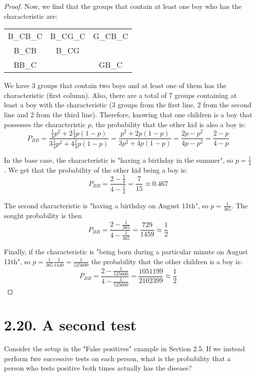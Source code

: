 \begin{proof}
    \pagebreak

    Now, we find that the groups that contain at least one boy who has the characteristic are:

    \begin{table}[h]
        \centering
        \begin{tabular}{c c c}
            B_CB_C & B_CG_C & G_CB_C \\
            B_CB & B_CG & \\
            BB_C & & GB_C & \\
        \end{tabular}
    \end{table}

    We have 3 groups that contain two boys and at least one of them has the characteristic
    (first column). Also, there are a total of 7 groups containing at least a boy with the 
    characteristic (3 groups from the first line, 2 from the second
    line and 2 from the third line). Therefore, knowing that one children is a boy that possesses
    the characteristic $p$, the probability that the other kid is also a boy is:
    \[
        P_{BB} = \frac{\frac{1}{4}p^2 + 2 \frac{1}{4}p(1 - p)}{3 \frac{1}{4}p^2 + 4 \frac{1}{4} p(1 - p)}
        = \frac{p^2 + 2p(1 - p)}{3p^2 + 4p(1 - p)}
        = \frac{2p - p^2}{4p - p^2} 
        = \frac{2 - p}{4 - p}
    \] 

    In the base case, the characteristic is "having a birthday in the summer", so $p = \frac{1}{4}$.
    We get that the probability of the other kid being a boy is:
    \[
        P_{BB} = \frac{2 - \frac{1}{4}}{4 - \frac{1}{4}} = \frac{7}{15} \approx 0.467
    \] 

    The second characteristic is "having a birthday on August 11th", so $p = \frac{1}{365}$.
    The sought probability is then
    \[
        P_{BB} = \frac{2 - \frac{1}{365}}{4 - \frac{1}{365}} = \frac{729}{1459} \approx \frac{1}{2}
    \] 

    Finally, if the characteristic is "being born during a particular minute on August 11th", 
    so $p = \frac{1}{365} \frac{1}{1440} = \frac{1}{525600}$
    the probability that the other children is a boy is:
    \[
        P_{BB} = \frac{2 - \frac{1}{525600}}{4 - \frac{1}{525600}} = \frac{1051199}{2102399} \approx \frac{1}{2}
    \] 
\end{proof}

\section*{2.20. A second test}
Consider the setup in the "False positives" example in Section 2.5. If we instead perform 
$\emph{two}$ successive tests on each person, what is the probability that a person
who tests positive both times actually has the disease?

